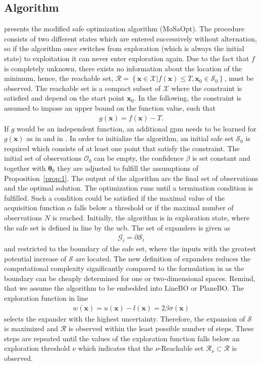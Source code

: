 \documentclass{ifacconf}
\newcounter{part}
\newcommand{\linea}[1]{line\:{\footnotesize \textbf{(#1)}}}
\newcommand{\bx}{\bm{x}}
\begin{document}
\subsection{Algorithm}
 presents the modified safe optimization algorithm (MoSaOpt). The procedure consists of two different states which are entered successively without alternation, so if the algorithm once switches from exploration (which is always the initial state) to exploitation it can never enter exploration again. Due to the fact that \(f\) is completely unknown, there exists no information about the location of the minimum, hence, the reachable set, \(\mathcal{R} = \left\{\bm{x}\in \mathcal{X}\vert f(\bm{x})\leq T, \bx_0 \in \mathcal{S}_0\right\}\), must be observed. The reachable set is a compact subset of \(\mathcal{X}\) where the constraint is satisfied and depend on the start point \(\bx_0\). In the following, the constraint is assumed to impose an upper bound on the function value, such that 
\begin{align}
    g(\bx) = f(\bx) - T.
\end{align}
If \(g\) would be an independent function, an additional \gls{gpm} needs to be learned for \(g(\bx)\) as in \cite{safeBO3} and in \cite{heat_pump2}.
In order to initialize the algorithm, an initial safe set \(\mathcal{S}_0\) is required which consists of at least one point that satisfy the constraint. The initial set of observations \(\mathcal{O}_0\) can be empty, the confidence \(\beta\) is set constant and together with \(\bm{\theta }_0\) they are adjusted to fulfill the assumptions of Proposition~\ref{prop:1}. The output of the algorithm are the final set of observations and the optimal solution.
The optimization runs until a termination condition is fulfilled. Such a condition could be satisfied if the maximal value of the acquisition function \(\alpha\) falls below a threshold or if the maximal number of observations \(N\) is reached. Initially, the algorithm is in exploration state, where the safe set is defined in \linea{4} by the \gls{ucb}. The set of expanders is given as
\begin{align}
    \mathcal{G}_i = \partial\mathcal{S}_i
\end{align} 
and restricted to the boundary of the safe set, where the inputs with the greatest potential increase of \(\mathcal{S}\) are located. The new definition of expanders reduces the computational complexity significantly compared to the formulation in \cite{safeoptberkenkamp} as the boundary can be cheaply determined for one or two-dimensional spaces. Remind, that we assume the algorithm to be embedded into LineBO or PlaneBO. The exploration function in \linea{6}
\begin{align}
w(\bm{x}) = u(\bx) - l(\bx) = 2\beta\sigma(\bx)    
\end{align}
selects the expander with the highest uncertainty. Therefore, the expansion of \(\mathcal{S}\) is maximized and \(\mathcal{R}\) is observed within the least possible number of steps. These steps are repeated until the values of the exploration function falls below an exploration threshold \(\nu\) which indicates that the \(\nu\)-Reachable set \(\mathcal{R}_\nu \subset\mathcal{R}\) is observed. 
\end{document}
